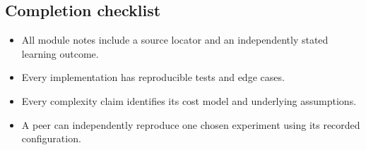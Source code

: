 \documentclass[11pt,letterpaper]{article}
\begin{document}
\subsection{Completion checklist}
\begin{itemize}\item All module notes include a source locator and an independently stated learning outcome.
\item Every implementation has reproducible tests and edge cases.
\item Every complexity claim identifies its cost model and underlying assumptions.
\item A peer can independently reproduce one chosen experiment using its recorded configuration.
\end{itemize}
\end{document}

